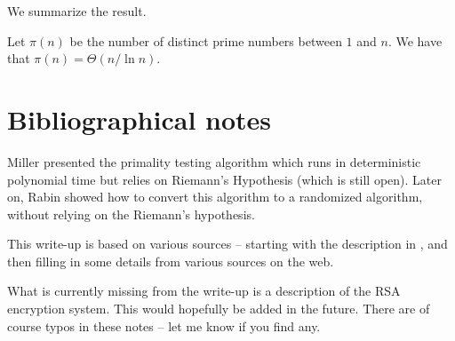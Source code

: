 We summarize the result.

\begin{theorem}
    Let $\pi(n)$ be the number of distinct prime numbers between $1$
    and $n$. We have that $\pi(n) = \Theta( n / \ln n )$.
\end{theorem}


\section{Bibliographical notes}

Miller \cite{m-rhtp-76} presented the primality testing algorithm
which runs in deterministic polynomial time but relies on\newline
Riemann's Hypothesis (which is still open).  Later on, Rabin
\cite{r-patp-80} showed how to convert this algorithm to a
randomized algorithm, without relying on the Riemann's hypothesis.


This write-up is based on various sources -- starting with the
description in \cite{mr-ra-95}, and then filling in some details from
various sources on the web.


What is currently missing from the write-up is a description of the
R{S}A encryption system. This would hopefully be added in the
future. There are of course typos in these notes -- let me know if you
find any.




\ChapterEnd{}

